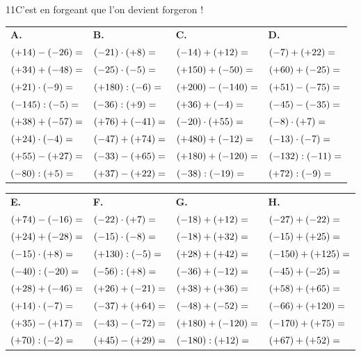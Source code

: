 \begin{exercice}{11}{C’est en forgeant que l’on devient forgeron !}

{\small
\bigskip
\def\arraystretch{1.25}
\begin{tabularx}{\linewidth}{*{4}{X}}
\textbf{A.} & \textbf{B.} & \textbf{C.} & \textbf{D.} \\
$(+14)-(-26)= \dotfill$ & $(-21)\cdot(+8)= \dotfill$ & $(-14)+(+12)= \dotfill$ & $(-7)+(+22)= \dotfill$ \\
$(+34)+(-48)= \dotfill$ & $(-25)\cdot(-5)= \dotfill$ & $(+150)+(-50)= \dotfill$ & $(+60)+(-25)= \dotfill$ \\
$(+21)\cdot(-9)= \dotfill$ & $(+180):(-6)= \dotfill$ & $(+200)-(-140)= \dotfill$ & $(+51)-(-75)= \dotfill$ \\
$(-145):(-5)= \dotfill$ & $(-36):(+9)= \dotfill$ & $(+36)+(-4)= \dotfill$ & $(-45)-(-35)= \dotfill$ \\
$(+38)+(-57)= \dotfill$ & $(+76)+(-41)= \dotfill$ & $(-20)\cdot(+55)= \dotfill$ & $(-8)\cdot(+7)= \dotfill$ \\
$(+24)\cdot(-4)= \dotfill$ & $(-47)+(+74)= \dotfill$ & $(+480)+(-12)= \dotfill$ & $(-13)\cdot(-7)= \dotfill$ \\
$(+55)-(+27)= \dotfill$ & $(-33)-(+65)= \dotfill$ & $(+180)+(-120)= \dotfill$ & $(-132):(-11)= \dotfill$ \\
$(-80):(+5)= \dotfill$ & $(+37)-(+22)= \dotfill$ & $(-38):(-19)= \dotfill$ & $(+72):(-9)= \dotfill$ \\
\end{tabularx}

\bigskip
\begin{tabularx}{\linewidth}{*{4}{X}}
\textbf{E.} & \textbf{F.} & \textbf{G.} & \textbf{H.} \\
$(+74)-(-16)= \dotfill$ & $(-22)\cdot(+7)= \dotfill$ & $(-18)+(+12)= \dotfill$ & $(-27)+(-22)= \dotfill$ \\
$(+24)+(-28)= \dotfill$ & $(-15)\cdot(-8)= \dotfill$ & $(-18)+(+32)= \dotfill$ & $(-15)+(+25)= \dotfill$ \\
$(-15)\cdot(+8)= \dotfill$ & $(+130):(-5)= \dotfill$ & $(+28)+(+42)= \dotfill$ & $(-150)+(+125)= \dotfill$ \\
$(-40):(-20)= \dotfill$ & $(-56):(+8)= \dotfill$ & $(-36)+(-12)= \dotfill$ & $(-45)+(-25)= \dotfill$ \\
$(+28)+(-46)= \dotfill$ & $(+26)+(-21)= \dotfill$ & $(+38)+(+36)= \dotfill$ & $(+58)+(+65)= \dotfill$ \\
$(+14)\cdot(-7)= \dotfill$ & $(-37)+(+64)= \dotfill$ & $(-48)+(-52)= \dotfill$ & $(-66)+(+120)= \dotfill$ \\
$(+35)-(+17)= \dotfill$ & $(-43)-(-72)= \dotfill$ & $(+180)+(-120)= \dotfill$ & $(-170)+(+75)= \dotfill$ \\
$(+70):(-2)= \dotfill$ & $(+45)-(+29)= \dotfill$ & $(-180):(+12)= \dotfill$ & $(+67)+(+52)= \dotfill$ \\
\end{tabularx}

}
\end{exercice}
